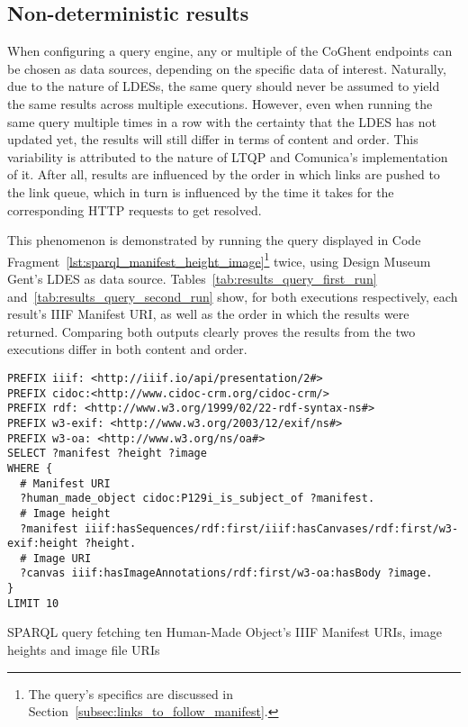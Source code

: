 \subsection{Non-deterministic results}

When configuring a query engine, any or multiple of the CoGhent endpoints can be chosen as data sources, depending on the specific data of interest. Naturally, due to the nature of LDESs, the same query should never be assumed to yield the same results across multiple executions. However, even when running the same query multiple times in a row with the certainty that the LDES has not updated yet, the results will still differ in terms of content and order. This variability is attributed to the nature of LTQP and Comunica's implementation of it. After all, results are influenced by the order in which links are pushed to the link queue, which in turn is influenced by the time it takes for the corresponding HTTP requests to get resolved.

This phenomenon is demonstrated by running the query displayed in Code Fragment~\ref{lst:sparql_manifest_height_image}\footnote{The query's specifics are discussed in Section~\ref{subsec:links_to_follow_manifest}.} twice, using Design Museum Gent's LDES as data source. Tables~\ref{tab:results_query_first_run} and~\ref{tab:results_query_second_run} show, for both executions respectively, each result's IIIF Manifest URI, as well as the order in which the results were returned. Comparing both outputs clearly proves the results from the two executions differ in both content and order.

\begin{listing}[htbp]
    \begin{verbatim}
PREFIX iiif: <http://iiif.io/api/presentation/2#>
PREFIX cidoc:<http://www.cidoc-crm.org/cidoc-crm/>
PREFIX rdf: <http://www.w3.org/1999/02/22-rdf-syntax-ns#>
PREFIX w3-exif: <http://www.w3.org/2003/12/exif/ns#>
PREFIX w3-oa: <http://www.w3.org/ns/oa#>
SELECT ?manifest ?height ?image
WHERE {
  # Manifest URI
  ?human_made_object cidoc:P129i_is_subject_of ?manifest.
  # Image height
  ?manifest iiif:hasSequences/rdf:first/iiif:hasCanvases/rdf:first/w3-exif:height ?height.
  # Image URI
  ?canvas iiif:hasImageAnnotations/rdf:first/w3-oa:hasBody ?image.
}
LIMIT 10
    \end{verbatim}
    \caption{SPARQL query fetching ten Human-Made Object's IIIF Manifest URIs, image heights and image file URIs}
    \label{lst:sparql_manifest_height_image}
\end{listing}

